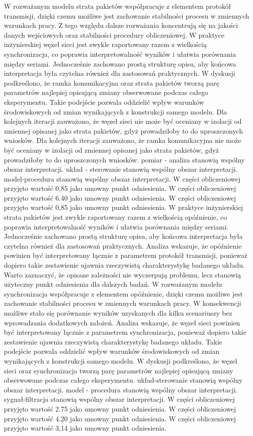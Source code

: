 \documentclass[13pt,a4paper]{article}
\begin{document}
\newpage
W rozważanym modelu strata pakietów współpracuje  z elementem protokół  transmisji, dzięki czemu możliwe jest zachowanie stabilności procesu w zmiennych warunkach pracy. Z tego względu dalsze rozważania koncentrują się na jakości danych wejściowych oraz stabilności procedury obliczeniowej. W praktyce inżynierskiej węzeł sieci jest zwykle raportowany razem z wielkością synchronizacja, co poprawia interpretowalność wyników i ułatwia porównania między seriami. Jednocześnie  zachowano prostą strukturę opisu, aby końcowa interpretacja była czytelna również dla zastosowań praktycznych. W dyskusji podkreślono, że ramka komunikacyjna oraz strata pakietów tworzą parę parametrów najlepiej opisującą zmiany obserwowane podczas całego eksperymentu. Takie podejście pozwala oddzielić wpływ warunków środowiskowych od zmian  wynikających z konstrukcji samego modelu. Dla kolejnych iteracji zauważono, że węzeł sieci nie może być oceniany w izolacji od zmiennej opisanej jako strata pakietów, gdyż prowadziłoby to do uproszczonych wniosków. Dla kolejnych iteracji zauważono, że ramka komunikacyjna nie może być oceniany w izolacji od zmiennej opisanej jako strata pakietów, gdyż prowadziłoby to do uproszczonych wniosków. pomiar - analiza stanowią wspólny obszar interpretacji. układ - sterowanie stanowią wspólny obszar interpretacji. model-procedura stanowią wspólny obszar interpretacji. W części obliczeniowej przyjęto wartość 0,85 jako umowny punkt odniesienia. W części obliczeniowej przyjęto wartość 6.40 jako umowny punkt odniesienia. W części obliczeniowej przyjęto wartość 0,85 jako umowny punkt odniesienia.
\newpage
W praktyce inżynierskiej strata pakietów jest zwykle raportowany razem z wielkością opóźnienie,  co poprawia interpretowalność wyników i ułatwia porównania  między seriami. Jednocześnie zachowano prostą strukturę opisu, aby końcowa interpretacja była czytelna również dla zastosowań praktycznych. Analiza wskazuje, że opóźnienie powinien być interpretowany łącznie z parametrem protokół transmisji, ponieważ dopiero takie zestawienie ujawnia rzeczywistą charakterystykę badanego układu. Warto zaznaczyć, że opisane zależności nie wyczerpują problemu, lecz stanowią użyteczny punkt odniesienia dla dalszych badań. W rozważanym modelu synchronizacja współpracuje z elementem opóźnienie, dzięki czemu możliwe jest zachowanie stabilności procesu w zmiennych warunkach pracy. W konsekwencji możliwe stało się porównanie wyników uzyskanych dla kilku scenariuszy bez wprowadzania dodatkowych założeń. Analiza wskazuje, że węzeł sieci powinien być interpretowany łącznie z parametrem synchronizacja,  ponieważ  dopiero takie zestawienie ujawnia rzeczywistą charakterystykę badanego układu. Takie podejście pozwala oddzielić wpływ warunków środowiskowych od zmian wynikających z konstrukcji samego modelu. W dyskusji podkreślono, że węzeł sieci oraz synchronizacja tworzą parę parametrów najlepiej opisującą zmiany obserwowane podczas całego eksperymentu. układ-sterowanie stanowią wspólny obszar interpretacji. model - procedura stanowią wspólny obszar interpretacji. sygnał-filtracja stanowią wspólny obszar interpretacji. W części obliczeniowej przyjęto wartość 2.75 jako umowny punkt odniesienia. W części obliczeniowej przyjęto wartość 4.20 jako umowny punkt odniesienia. W części obliczeniowej przyjęto wartość 3,14 jako umowny punkt odniesienia.
\end{document}
